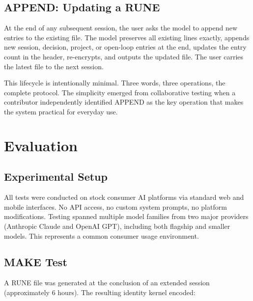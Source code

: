 \documentclass[11pt,a4paper]{article}
\begin{document}
\subsection{APPEND: Updating a RUNE}

At the end of any subsequent session, the user asks the model to append new entries to the existing file. The model preserves all existing lines exactly, appends new session, decision, project, or open-loop entries at the end, updates the entry count in the header, re-encrypts, and outputs the updated file. The user carries the latest file to the next session.

This lifecycle is intentionally minimal. Three words, three operations, the complete protocol. The simplicity emerged from collaborative testing when a contributor independently identified APPEND as the key operation that makes the system practical for everyday use.

\section{Evaluation}

\subsection{Experimental Setup}

All tests were conducted on stock consumer AI platforms via standard web and mobile interfaces. No API access, no custom system prompts, no platform modifications. Testing spanned multiple model families from two major providers (Anthropic Claude and OpenAI GPT), including both flagship and smaller models. This represents a common consumer usage environment.

\subsection{MAKE Test}

A RUNE file was generated at the conclusion of an extended session (approximately 6 hours). The resulting identity kernel encoded:
\end{document}
